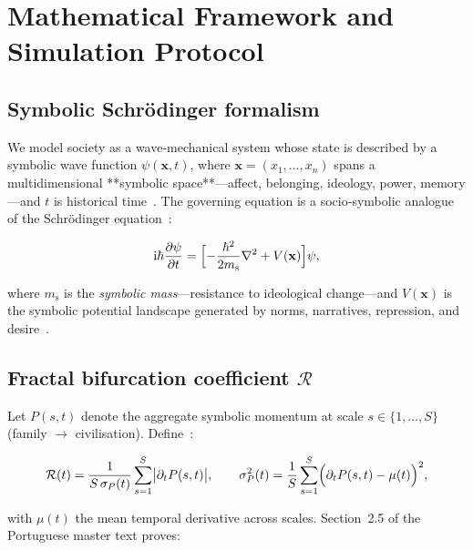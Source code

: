 \section{Mathematical Framework and Simulation Protocol}
\label{sec:methods}

\subsection{Symbolic Schrödinger formalism}

We model society as a wave‑mechanical system whose state is described by a
symbolic wave function $\psi(\mathbf{x},t)$, where
$\mathbf{x}=(x_{1},\ldots,x_{n})$ spans a multidimensional **symbolic
space**—affect, belonging, ideology, power, memory—and $t$ is historical
time \citep{mandelbrot1982,schrodinger1944}.
The governing equation is a socio‑symbolic analogue of the
Schrödinger equation :

\begin{equation}
\label{eq:social_schroedinger}
\mathrm{i}\hbar\frac{\partial\psi}{\partial t}
  =\Bigl[-\frac{\hbar^{2}}{2m_{\mathrm{s}}}\nabla^{2}+V(\mathbf{x})\Bigr]\psi,
\end{equation}

where $m_{\mathrm{s}}$ is the \emph{symbolic mass}—resistance to
ideological change—and $V(\mathbf{x})$ is the symbolic potential
landscape generated by norms, narratives, repression, and desire .

\subsection{Fractal bifurcation coefficient \texorpdfstring{$\mathcal{R}$}{R}}

Let $P(s,t)$ denote the aggregate symbolic momentum at scale
$s\!\in\!\{1,\ldots,S\}$ (family $\rightarrow$ civilisation).
Define \citep{sporns2011,scheffer2009}:

\begin{equation}
\label{eq:R_def}
\mathcal{R}(t)=\frac{1}{S\,\sigma_{P}(t)}
\sum_{s=1}^{S}\bigl|\partial_{t}P(s,t)\bigr|,
\qquad
\sigma_{P}^{2}(t)=\frac{1}{S}\sum_{s=1}^{S}
\Bigl(\partial_{t}P(s,t)-\mu(t)\Bigr)^{2},
\end{equation}

with $\mu(t)$ the mean temporal derivative across scales.
Section~2.5 of the Portuguese master text proves:

